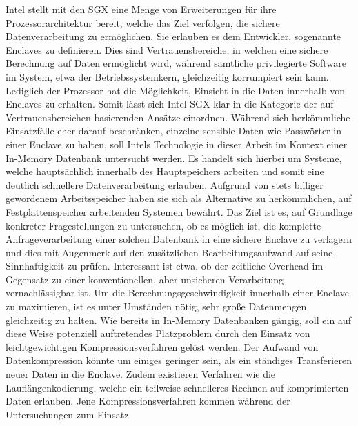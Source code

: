 Intel stellt mit den \ac{SGX} eine Menge von Erweiterungen für ihre Prozessorarchitektur bereit, welche das Ziel verfolgen, die sichere Datenverarbeitung zu ermöglichen. Sie erlauben es dem Entwickler, sogenannte Enclaves zu definieren. Dies sind Vertrauensbereiche, in welchen eine sichere Berechnung auf Daten ermöglicht wird, während sämtliche privilegierte Software im System, etwa der Betriebssystemkern, gleichzeitig korrumpiert sein kann. Lediglich der Prozessor hat die Möglichkeit, Einsicht in die Daten innerhalb von Enclaves zu erhalten. Somit lässt sich Intel \ac{SGX} klar in die Kategorie der auf Vertrauensbereichen basierenden Ansätze einordnen. Während sich herkömmliche Einsatzfälle eher darauf beschränken, einzelne sensible Daten wie Passwörter in einer Enclave zu halten, soll Intels Technologie in dieser Arbeit im Kontext einer In-Memory Datenbank untersucht werden. Es handelt sich hierbei um Systeme, welche hauptsächlich innerhalb des Hauptspeichers arbeiten und somit eine deutlich schnellere Datenverarbeitung erlauben. Aufgrund von stets billiger gewordenem Arbeitsspeicher haben sie sich als Alternative zu herkömmlichen, auf Festplattenspeicher arbeitenden Systemen bewährt. Das Ziel ist es, auf Grundlage konkreter Fragestellungen zu untersuchen, ob es möglich ist, die komplette Anfrageverarbeitung einer solchen Datenbank in eine sichere Enclave zu verlagern und dies mit Augenmerk auf den zusätzlichen Bearbeitungsaufwand auf seine Sinnhaftigkeit zu prüfen. Interessant ist etwa, ob der zeitliche Overhead im Gegensatz zu einer konventionellen, aber unsicheren Verarbeitung vernachlässigbar ist. Um die Berechnungsgeschwindigkeit innerhalb einer Enclave zu maximieren, ist es unter Umständen nötig, sehr große Datenmengen gleichzeitig zu halten. Wie bereits in In-Memory Datenbanken gängig, soll ein auf diese Weise potenziell auftretendes Platzproblem durch den Einsatz von leichtgewichtigen Kompressionsverfahren gelöst werden. Der Aufwand von Datenkompression könnte um einiges geringer sein, als ein ständiges Transferieren neuer Daten in die Enclave. Zudem existieren Verfahren wie die Lauflängenkodierung, welche ein teilweise schnelleres Rechnen auf komprimierten Daten erlauben. Jene Kompressionsverfahren kommen während der Untersuchungen zum Einsatz.

